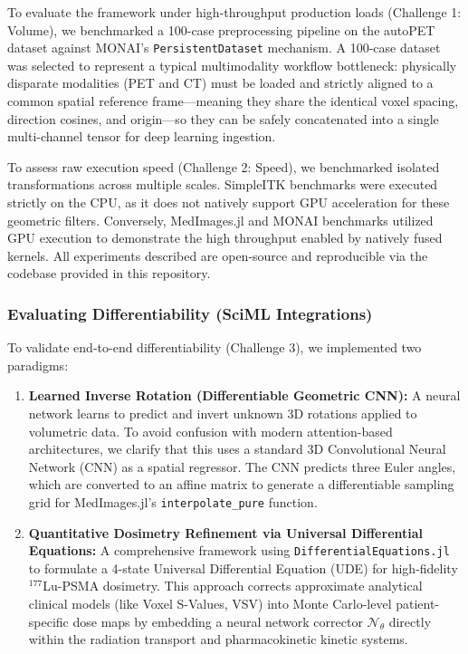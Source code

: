\documentclass[10pt,letterpaper]{article}
\begin{document}
To evaluate the framework under high-throughput production loads (Challenge 1: Volume), we benchmarked a 100-case preprocessing pipeline on the autoPET dataset \cite{Dexl_2025} against MONAI's \texttt{PersistentDataset} mechanism. A 100-case dataset was selected to represent a typical multimodality workflow bottleneck: physically disparate modalities (PET and CT) must be loaded and strictly aligned to a common spatial reference frame---meaning they share the identical voxel spacing, direction cosines, and origin---so they can be safely concatenated into a single multi-channel tensor for deep learning ingestion. 

To assess raw execution speed (Challenge 2: Speed), we benchmarked isolated transformations across multiple scales. SimpleITK benchmarks were executed strictly on the CPU, as it does not natively support GPU acceleration for these geometric filters. Conversely, MedImages.jl and MONAI benchmarks utilized GPU execution to demonstrate the high throughput enabled by natively fused kernels. All experiments described are open-source and reproducible via the codebase provided in this repository.

\subsubsection*{Evaluating Differentiability (SciML Integrations)}
To validate end-to-end differentiability (Challenge 3), we implemented two paradigms:
\begin{enumerate}
    \item \textbf{Learned Inverse Rotation (Differentiable Geometric CNN):} A neural network learns to predict and invert unknown 3D rotations applied to volumetric data. To avoid confusion with modern attention-based architectures, we clarify that this uses a standard 3D Convolutional Neural Network (CNN) as a spatial regressor. The CNN predicts three Euler angles, which are converted to an affine matrix to generate a differentiable sampling grid for MedImages.jl's \texttt{interpolate\_pure} function. 
    \item \textbf{Quantitative Dosimetry Refinement via Universal Differential Equations:} A comprehensive framework using \texttt{DifferentialEquations.jl} \cite{Rackauckas_2017} to formulate a 4-state Universal Differential Equation (UDE) for high-fidelity $^{177}$Lu-PSMA dosimetry. This approach corrects approximate analytical clinical models (like Voxel S-Values, VSV) into Monte Carlo-level patient-specific dose maps by embedding a neural network corrector $\mathcal{N}_\theta$ directly within the radiation transport and pharmacokinetic kinetic systems.
\end{enumerate}
\end{document}
